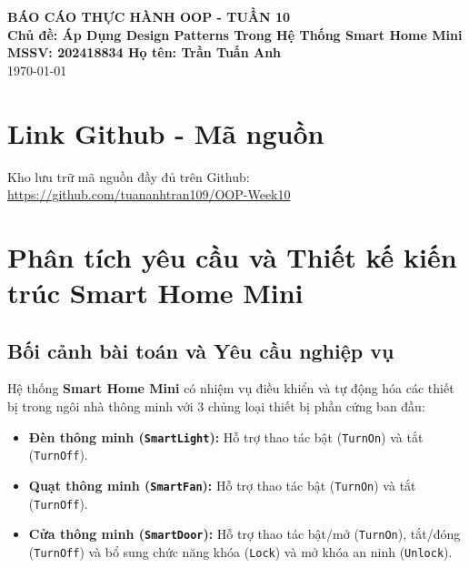 \documentclass[11pt,a4paper]{article}
\begin{document}
\begin{center}
    {\LARGE \textbf{BÁO CÁO THỰC HÀNH OOP - TUẦN 10}}\\[0.15cm]
    {\large \textbf{Chủ đề: Áp Dụng Design Patterns Trong Hệ Thống Smart Home Mini}}\\[0.25cm]
    \textbf{MSSV: 202418834 \quad Họ tên: Trần Tuấn Anh}\\[0.15cm]
    \today
\end{center}

\vspace{-0.1cm}

\section{Link Github - Mã nguồn}
Kho lưu trữ mã nguồn đầy đủ trên Github: \url{https://github.com/tuananhtran109/OOP-Week10}

\section{Phân tích yêu cầu và Thiết kế kiến trúc Smart Home Mini}

\subsection{Bối cảnh bài toán và Yêu cầu nghiệp vụ}
Hệ thống \textbf{Smart Home Mini} có nhiệm vụ điều khiển và tự động hóa các thiết bị trong ngôi nhà thông minh với 3 chủng loại thiết bị phần cứng ban đầu:
\begin{itemize}[itemsep=1.0pt]
    \item \textbf{Đèn thông minh (\texttt{SmartLight}):} Hỗ trợ thao tác bật (\texttt{TurnOn}) và tắt (\texttt{TurnOff}).
    \item \textbf{Quạt thông minh (\texttt{SmartFan}):} Hỗ trợ thao tác bật (\texttt{TurnOn}) và tắt (\texttt{TurnOff}).
    \item \textbf{Cửa thông minh (\texttt{SmartDoor}):} Hỗ trợ thao tác bật/mở (\texttt{TurnOn}), tắt/đóng (\texttt{TurnOff}) và bổ sung chức năng khóa (\texttt{Lock}) và mở khóa an ninh (\texttt{Unlock}).
\end{itemize}
\end{document}
